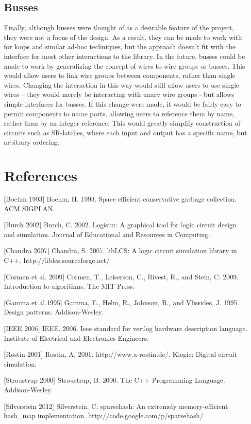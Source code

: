 \documentclass{article}
\begin{document}
\subsection{Busses}
Finally, although busses were thought of as a desirable feature of the project, they were not a focus of the design. As a result, they can be made to work with for loops and similar ad-hoc techniques, but the approach doesn’t fit with the interface for most other interactions to the library. In the future, busses could be made to work by generalizing the concept of wires to wire groups or busses. This would allow users to link wire groups between components, rather than single wires. Changing the interaction in this way would still allow users to use single wires -- they would merely be interacting with unary wire groups - but allows simple interfaces for busses. If this change were made, it would be fairly easy to permit components to name ports, allowing users to reference them by name, rather than by an integer reference. This would greatly simplify construction of circuits such as SR-latches, where each input and output has a specific name, but arbitrary ordering.

\section{References}

[Boehm 1993] Boehm, H. 1993. Space efficient conservative garbage collection. ACM SIGPLAN.

[Burch 2002] Burch, C. 2002. Logisim: A graphical tool for logic circuit design and simulation. Journal of Educational and Resources in Computing.

[Chandra 2007] Chandra, S. 2007. libLCS: A logic circuit simulation library in C++. http://liblcs.sourceforge.net/

[Cormen et al. 2009] Cormen, T., Leiserson, C., Rivest, R., and Stein, C. 2009. Introduction to algorithms. The MIT Press.

[Gamma et al.1995] Gamma, E., Helm, R., Johnson, R., and Vlissides, J. 1995. Design patterns. Addison-Wesley.

[IEEE 2006] IEEE. 2006. Ieee standard for verilog hardware description language. Institute of Electrical and Electronics Engineers.

[Rostin 2001] Rostin, A. 2001. http://www.a-rostin.de/. Klogic: Digital circuit simulation.

[Stroustrup 2000] Stroustrup, B. 2000. The C++ Programming Language. Addison-Wesley.

[Silverstein 2012] Silverstein, C. sparsehash: An extremely memory-efficient hash\_map implementation. http://code.google.com/p/sparsehash/
\end{document}
